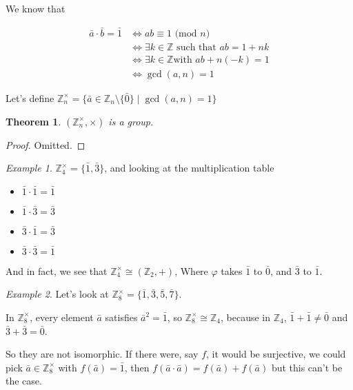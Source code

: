 \documentclass[12pt]{article}
\def\phi{\varphi}
\def\Z{{\mathbb Z}}
\renewcommand{\mod}[1]{\text{ (mod $#1$) }}
\newtheorem{theorem}{Theorem}
\theoremstyle{remark}
\theoremstyle{remark}
\theoremstyle{remark}
\newtheorem{example}{Example}
\theoremstyle{remark}
\theoremstyle{remark}
\begin{document}
We know that

\begin{align*}
	\bar a \cdot \bar b = \bar 1 & \Leftrightarrow ab \equiv 1 \mod n           \\
	                             & \Leftrightarrow \exists k \in \Z \text{ such
	that } ab = 1 + nk                                                          \\
	                             & \Leftrightarrow \exists k \in \Z \text{
	with } ab + n(-k) = 1                                                       \\
	                             & \Leftrightarrow \gcd(a, n) = 1
\end{align*}

Let's define $\Z_n^\times = \{\bar a \in \Z_n \setminus \{\bar 0\} \mid \gcd(a,
	n) = 1\}$

\begin{theorem}
  $(\Z_n^\times, \times)$ is a group.
\end{theorem}

\begin{proof}
  Omitted.
\end{proof}

\begin{example}
	$\Z_4^\times = \{\bar 1, \bar 3\}$, and looking at the multiplication table

	\begin{itemize}
		\item $\bar 1 \cdot \bar 1 = \bar 1$
		\item $\bar 1 \cdot \bar 3 = \bar 3$
		\item $\bar 3 \cdot \bar 1 = \bar 3$
		\item $\bar 3 \cdot \bar 3 = \bar 1$
	\end{itemize}

	And in fact, we see that $\Z_4^\times \cong (\Z_2, +)$, Where $\phi$ takes
	$\bar 1$ to $\bar 0$, and $\bar 3$ to $\bar 1$.
\end{example}

\begin{example}
	Let's look at $\Z_8^\times = \{\bar 1, \bar 3, \bar 5, \bar 7\}$.

	In $\Z_8^\times$, every element $\bar a$ satisfies $\bar a^2 = \bar 1$, so
	$\Z_8^\times \cong \Z_4$, because in $\Z_4$, $\bar 1 + \bar 1 \ne \bar 0$ and
	$\bar 3 + \bar 3 = \bar 0$.

	So they are not isomorphic. If there were, say $f$, it would be
	surjective, we could pick $\bar a \in \Z_8^\times$ with $f(\bar a) = \bar 1$,
	then $f(\bar a \cdot \bar a) = f(\bar a) + f(\bar a)$ but this can't be
	the case.
\end{example}
\end{document}
